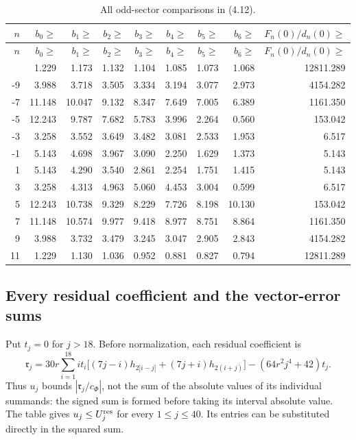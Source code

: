 {\scriptsize
\setlength{\tabcolsep}{3pt}
\begin{longtable}{rrrrrrrrr}
\caption{All odd-sector comparisons in (4.12).}\label{tab:odd-all}\\
\toprule $n$ & $b_0\ge$ & $b_1\ge$ & $b_2\ge$ & $b_3\ge$ & $b_4\ge$ & $b_5\ge$ & $b_6\ge$ & $F_n(0)/d_n(0)\ge$\\ \midrule
\endfirsthead
\toprule $n$ & $b_0\ge$ & $b_1\ge$ & $b_2\ge$ & $b_3\ge$ & $b_4\ge$ & $b_5\ge$ & $b_6\ge$ & $F_n(0)/d_n(0)\ge$\\ \midrule
\endhead
\bottomrule\endfoot
-11 & 1.229 & 1.173 & 1.132 & 1.104 & 1.085 & 1.073 & 1.068 & 12811.289\\
-9 & 3.988 & 3.718 & 3.505 & 3.334 & 3.194 & 3.077 & 2.973 & 4154.282\\
-7 & 11.148 & 10.047 & 9.132 & 8.347 & 7.649 & 7.005 & 6.389 & 1161.350\\
-5 & 12.243 & 9.787 & 7.682 & 5.783 & 3.996 & 2.264 & 0.560 & 153.042\\
-3 & 3.258 & 3.552 & 3.649 & 3.482 & 3.081 & 2.533 & 1.953 & 6.517\\
-1 & 5.143 & 4.698 & 3.967 & 3.090 & 2.250 & 1.629 & 1.373 & 5.143\\
1 & 5.143 & 4.290 & 3.540 & 2.861 & 2.254 & 1.751 & 1.415 & 5.143\\
3 & 3.258 & 4.313 & 4.963 & 5.060 & 4.453 & 3.004 & 0.599 & 6.517\\
5 & 12.243 & 10.738 & 9.329 & 8.229 & 7.726 & 8.198 & 10.130 & 153.042\\
7 & 11.148 & 10.574 & 9.977 & 9.418 & 8.977 & 8.751 & 8.864 & 1161.350\\
9 & 3.988 & 3.732 & 3.479 & 3.245 & 3.047 & 2.905 & 2.843 & 4154.282\\
11 & 1.229 & 1.130 & 1.036 & 0.952 & 0.881 & 0.827 & 0.794 & 12811.289\\
\end{longtable}
}

\subsection{Every residual coefficient and the vector-error sums}
Put $t_j=0$ for $j>18$. Before normalization, each residual coefficient is
\begin{equation}\label{eq:raw-residual-expanded}
 \mathfrak r_j=30r\sum_{i=1}^{18} i t_i
 \big[(7j-i)h_{2|i-j|}+(7j+i)h_{2(i+j)}\big]
 -(64r^2j^4+42)t_j.
\end{equation}
Thus $u_j$ bounds $|\mathfrak r_j/c_\Phi|$, not the sum of the absolute values
of its individual summands: the signed sum is formed before taking its
interval absolute value. The table gives $u_j\le U_j^{\rm res}$ for every
$1\le j\le40$. Its entries can be substituted directly in the squared sum.

